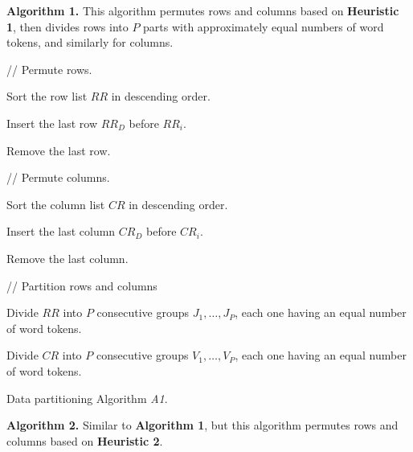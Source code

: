 \documentclass[10pt,conference]{IEEEtran}
\begin{document}
\textbf{Algorithm 1.} This algorithm permutes rows and columns based on \textbf{Heuristic 1}, then divides rows into $P$ parts with approximately equal numbers of word tokens, and similarly for columns.

\begin{algorithm} [h]


\nonl// Permute rows.

Sort the row list $RR$ in descending order.

 {
	 {
		Insert the last row $RR_D$ before $RR_i$.
		
		Remove the last row.
	}
}
	
\nonl// Permute columns.

Sort the column list $CR$ in descending order.

 {
	 {
		Insert the last column $CR_D$ before $CR_i$.
		
		Remove the last column.
	}
}

\nonl// Partition rows and columns

Divide $RR$ into $P$ consecutive groups $J_1, \ldots, J_P$, each one having an equal number of word tokens.

Divide $CR$ into $P$ consecutive groups $V_1, \ldots, V_P$, each one having an equal number of word tokens.

\caption{Data partitioning Algorithm \textit{A1}.}	
\label{A1}
\end{algorithm}

\textbf{Algorithm 2.} Similar to \textbf{Algorithm 1}, but this algorithm permutes rows and columns based on \textbf{Heuristic 2}.
\end{document}
